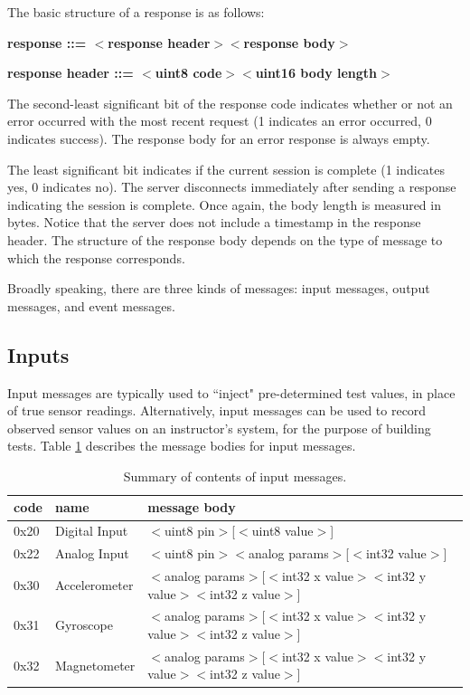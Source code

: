 \documentclass[12pt]{article}
\begin{document}
\begin{appendices}
The basic structure of a response is as follows:

\textbf{response ::= $<$response header$>$$<$response body$>$}

\textbf{response header ::= $<$uint8 code$>$$<$uint16 body length$>$}

\noindent The second-least significant bit of the response code indicates whether or not an error occurred with the most recent request (1 indicates an error occurred, 0 indicates success).  The response body for an error response is always empty.

The least significant bit indicates if the current session is complete (1 indicates yes, 0 indicates no).  The server disconnects immediately after sending a response indicating the session is complete.  Once again, the body length is measured in bytes.  Notice that the server does not include a timestamp in the response header.  The structure of the response body depends on the type of message to which the response corresponds.

Broadly speaking, there are three kinds of messages: input messages, output messages, and event messages.

\subsection{Inputs}
Input messages are typically used to ``inject" pre-determined test values, in place of true sensor readings.  Alternatively, input messages can be used to record observed sensor values on an instructor's system, for the purpose of building tests.  Table \ref{table:input-messages} describes the message bodies for input messages.

\begin{table}[ht]
\begin{center}
\begin{tabular}{l l l}
code & name & message body \\ \hline
0x20 & Digital Input & $<$uint8 pin$>$[$<$uint8 value$>$] \\
0x22 & Analog Input & $<$uint8 pin$>$$<$analog params$>$[$<$int32 value$>$] \\
0x30 & Accelerometer & $<$analog params$>$[$<$int32 x value$>$$<$int32 y value$>$$<$int32 z value$>$] \\
0x31 & Gyroscope & $<$analog params$>$[$<$int32 x value$>$$<$int32 y value$>$$<$int32 z value$>$] \\
0x32 & Magnetometer & $<$analog params$>$[$<$int32 x value$>$$<$int32 y value$>$$<$int32 z value$>$] \\ \hline
\end{tabular}
\caption{Summary of contents of input messages.}
\label{table:input-messages}
\end{center}
\end{table}


\end{appendices}
\end{document}

